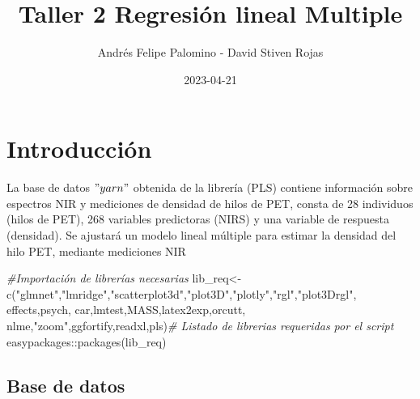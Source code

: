 \documentclass[
]{article}
\title{Taller 2 Regresión lineal Multiple}
\author{Andrés Felipe Palomino - David Stiven Rojas}
\date{2023-04-21}
\newenvironment{Shaded}{\begin{snugshade}}{\end{snugshade}}
\newcommand{\CommentTok}[1]{\textcolor[rgb]{0.56,0.35,0.01}{\textit{#1}}}
\newcommand{\FunctionTok}[1]{\textcolor[rgb]{0.00,0.00,0.00}{#1}}
\newcommand{\NormalTok}[1]{#1}
\newcommand{\OtherTok}[1]{\textcolor[rgb]{0.56,0.35,0.01}{#1}}
\newcommand{\SpecialCharTok}[1]{\textcolor[rgb]{0.00,0.00,0.00}{#1}}
\newcommand{\StringTok}[1]{\textcolor[rgb]{0.31,0.60,0.02}{#1}}
\begin{document}
\maketitle

\hypertarget{introducciuxf3n}{%
\section{Introducción}\label{introducciuxf3n}}

La base de datos \("yarn"\) obtenida de la librería (PLS) contiene
información sobre espectros NIR y mediciones de densidad de hilos de
PET, consta de 28 individuos (hilos de PET), 268 variables predictoras
(NIRS) y una variable de respuesta (densidad). Se ajustará un modelo
lineal múltiple para estimar la densidad del hilo PET, mediante
mediciones NIR

\begin{Shaded}
\begin{Highlighting}[]
\CommentTok{\#Importación de librerías necesarias}
\NormalTok{lib\_req}\OtherTok{\textless{}{-}}\FunctionTok{c}\NormalTok{(}\StringTok{"glmnet"}\NormalTok{,}\StringTok{"lmridge"}\NormalTok{,}\StringTok{"scatterplot3d"}\NormalTok{,}\StringTok{"plot3D"}\NormalTok{,}\StringTok{"plotly"}\NormalTok{,}\StringTok{"rgl"}\NormalTok{,}\StringTok{"plot3Drgl"}\NormalTok{,}
           \StringTok{\textquotesingle{}effects\textquotesingle{}}\NormalTok{,}\StringTok{\textquotesingle{}psych\textquotesingle{}}\NormalTok{,}
           \StringTok{\textquotesingle{}car\textquotesingle{}}\NormalTok{,}\StringTok{\textquotesingle{}lmtest\textquotesingle{}}\NormalTok{,}\StringTok{\textquotesingle{}MASS\textquotesingle{}}\NormalTok{,}\StringTok{\textquotesingle{}latex2exp\textquotesingle{}}\NormalTok{,}\StringTok{\textquotesingle{}orcutt\textquotesingle{}}\NormalTok{,}
           \StringTok{\textquotesingle{}nlme\textquotesingle{}}\NormalTok{,}\StringTok{"zoom"}\NormalTok{,}\StringTok{\textquotesingle{}ggfortify\textquotesingle{}}\NormalTok{,}\StringTok{\textquotesingle{}readxl\textquotesingle{}}\NormalTok{,}\StringTok{\textquotesingle{}pls\textquotesingle{}}\NormalTok{)}\CommentTok{\# Listado de librerias requeridas por el script}
\NormalTok{easypackages}\SpecialCharTok{::}\FunctionTok{packages}\NormalTok{(lib\_req)}
\end{Highlighting}
\end{Shaded}

\hypertarget{base-de-datos}{%
\subsection{Base de datos}\label{base-de-datos}}
\end{document}
